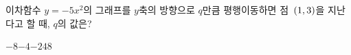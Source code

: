 이차함수 $y=-5x^2$의 그래프를 $y$축의 방향으로 $q$만큼 평행이동하면 점~$(1{,}\mkern3mu 3)$을 지난다고 할 때, $q$의 값은?
\begin{choices32}{$-8$}{$-4$}{$-2$}{$4$}{$8$}\end{choices32}
